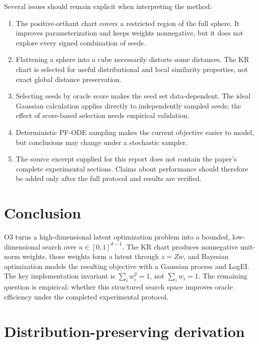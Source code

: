 \documentclass[11pt]{article}
\begin{document}
Several issues should remain explicit when interpreting the method:
\begin{enumerate}
    \item The positive-orthant chart covers a restricted region of the full
          sphere.  It improves parameterization and keeps weights
          nonnegative, but it does not explore every signed combination of
          seeds.
    \item Flattening a sphere into a cube necessarily distorts some distances.
          The KR chart is selected for useful distributional and local
          similarity properties, not exact global distance preservation.
    \item Selecting seeds by oracle score makes the seed set data-dependent.
          The ideal Gaussian calculation applies directly to independently
          sampled seeds; the effect of score-based selection needs empirical
          validation.
    \item Deterministic PF-ODE sampling makes the current objective easier to
          model, but conclusions may change under a stochastic sampler.
    \item The source excerpt supplied for this report does not contain the
          paper's complete experimental sections.  Claims about performance
          should therefore be added only after the full protocol and results
          are verified.
\end{enumerate}

\section{Conclusion}

O3 turns a high-dimensional latent optimization problem into a bounded,
low-dimensional search over \(u\in[0,1]^{d-1}\).  The KR chart produces
nonnegative unit-norm weights, those weights form a latent through
\(z=Zw\), and Bayesian optimization models the resulting objective with a
Gaussian process and LogEI.  The key implementation invariant is
\(\sum_iw_i^2=1\), not \(\sum_iw_i=1\).  The remaining question is empirical:
whether this structured search space improves oracle efficiency under the
completed experimental protocol.

\appendix

\section{Distribution-preserving derivation}
\label{app:distribution}
\end{document}
